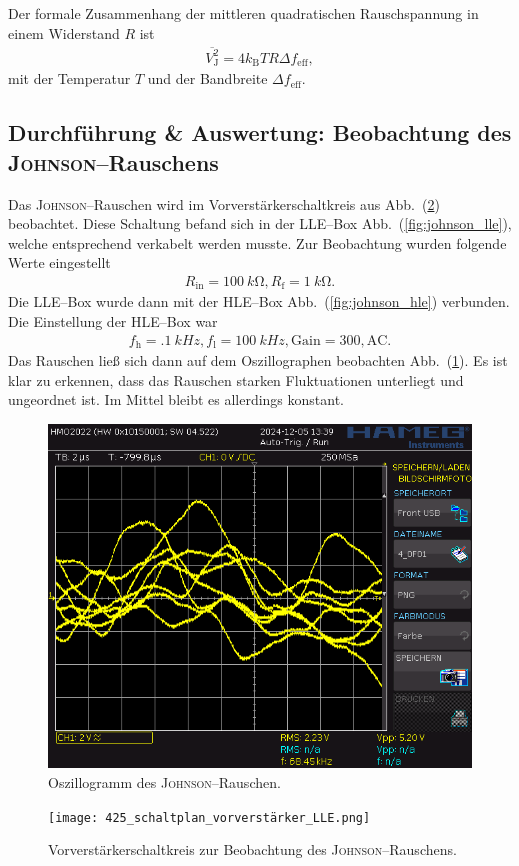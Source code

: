 \documentclass[sn-mathphys-num,iicol]{sn-jnl}
\theoremstyle{thmstyleone}
\theoremstyle{thmstyletwo}
\theoremstyle{thmstylethree}
\begin{document}
Der formale Zusammenhang der mittleren quadratischen Rauschspannung in einem Widerstand $R$ ist
\begin{align} 
        \overline{V^2_\text{J}}=4k_\text{B}TR\Delta f_\text{eff}
,\end{align} 
mit der Temperatur $T$ und der Bandbreite $\Delta f_\text{eff}$.

\subsection{Durchführung \& Auswertung: Beobachtung des \textsc{Johnson}--Rauschens}
Das \textsc{Johnson}--Rauschen wird im Vorverstärkerschaltkreis aus Abb.\ (\ref{fig:vorverstärker}) beobachtet.
Diese Schaltung befand sich in der LLE--Box Abb.\ (\ref{fig:johnson_lle}), welche entsprechend verkabelt werden musste.
Zur Beobachtung wurden folgende Werte eingestellt
\begin{align} 
        R_\text{in}=\SI{100}{k\ohm},R_\text{f}=\SI{1}{k\ohm}
.\end{align} 
Die LLE--Box wurde dann mit der HLE--Box Abb.\ (\ref{fig:johnson_hle}) verbunden.
Die Einstellung der HLE--Box war
\begin{align} 
        f_\text{h}=\SI{.1}{kHz},f_\text{l}=\SI{100}{kHz},\text{Gain}=300,\text{AC}
.\end{align} 
Das Rauschen ließ sich dann auf dem Oszillographen beobachten Abb.\ (\ref{fig:johnson_oszi}).
Es ist klar zu erkennen, dass das Rauschen starken Fluktuationen unterliegt und ungeordnet ist.
Im Mittel bleibt es allerdings konstant.

\begin{figure}[t]
        \centering
        \includegraphics[width=.5\textwidth]{../data/4_0F01.png}
        \caption{Oszillogramm des \textsc{Johnson}--Rauschen.} \label{fig:johnson_oszi}
\end{figure}

\begin{figure}[t]
        \centering
        \texttt{[image: 425\_schaltplan\_vorverstärker\_LLE.png]}
        \caption{Vorverstärkerschaltkreis zur Beobachtung des \textsc{Johnson}--Rauschens.\cite{anleitung425}} \label{fig:vorverstärker}
\end{figure}
\end{document}

